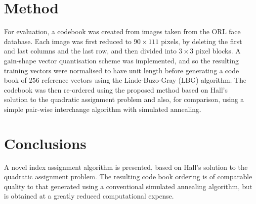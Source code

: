 \documentclass[a4paper]{report}
\begin{document}
\chapter{Method}

For evaluation, a codebook was created from images taken from the ORL face
database.  Each image was first reduced to $90 \times 111$ pixels,
by deleting the first and last columns and the last row, and then divided into
$3 \times 3$ pixel blocks.  A gain-shape vector quantisation scheme was
implemented, and so the resulting training vectors were normalised to have unit
length before generating a code book of 256 reference vectors using the
Linde-Buzo-Gray (LBG) algorithm.  The codebook was then
re-ordered using the proposed method based on Hall's solution to the quadratic
assignment problem and also, for comparison, using a simple pair-wise
interchange algorithm with simulated annealing.
\chapter{Conclusions}

A novel index assignment algorithm is presented, based on Hall's solution to the
quadratic assignment problem.  The resulting code book ordering is of comparable
quality to that generated using a conventional simulated annealing algorithm,
but is obtained at a greatly reduced computational expense.
\end{document}
